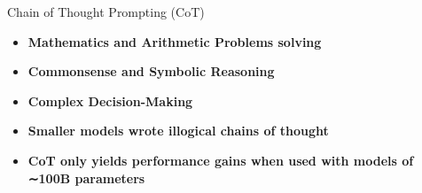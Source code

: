\documentclass[aspectratio=169, xcolor={dvipsnames}, 10pt, brazil]{beamer}
\begin{document}
\begin{frame}{Chain of Thought Prompting (CoT)}

    \begin{tcolorbox}[colback=green!10!white, colframe=green!70!black, title=\textbf{Merits}, fonttitle=\bfseries, coltitle=white, boxrule=0.8mm, sharp corners=southwest, enhanced, width=\textwidth-3cm, enlarge left by=1cm, drop shadow]
        \small %
        \begin{itemize}[label=\textcolor{green}{\scriptsize$\bullet$}, left=0pt, itemsep=0.2cm]
            \item \textbf{Mathematics and Arithmetic Problems solving}
            \item \textbf{Commonsense and Symbolic Reasoning}
            \item \textbf{Complex Decision-Making}
        \end{itemize}
    \end{tcolorbox}
    
    \vspace{0.4cm} %

    \begin{tcolorbox}[colback=red!10!white, colframe=red!70!black, title=\textbf{Limitations}, fonttitle=\bfseries, coltitle=white, boxrule=0.8mm, sharp corners=southwest, enhanced, width=\textwidth-3cm, enlarge left by=1cm, drop shadow]
        \small %
        \begin{itemize}[label=\textcolor{red}{\scriptsize$\bullet$}, left=0pt, itemsep=0.2cm]
            \item \textbf{Smaller models wrote illogical chains of thought}
            \item \textbf{CoT only yields performance gains when used with models of ∼100B parameters}
        \end{itemize}
    \end{tcolorbox}
    
\end{frame}
\end{document}
